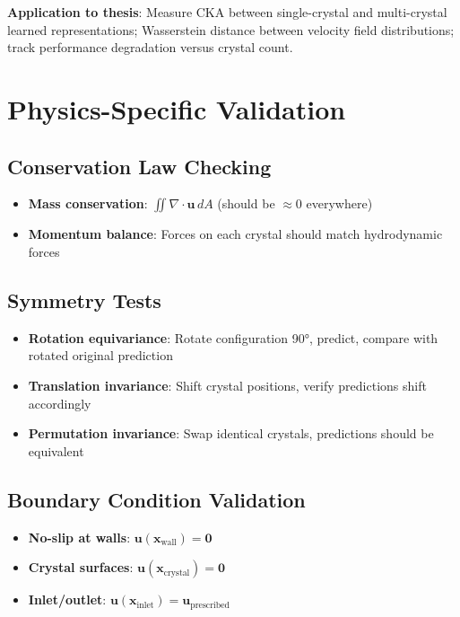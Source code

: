 \textbf{Application to thesis}: Measure CKA between single-crystal and multi-crystal learned representations; Wasserstein distance between velocity field distributions; track performance degradation versus crystal count.

\section{Physics-Specific Validation}

\subsection{Conservation Law Checking}
\begin{itemize}
    \item \textbf{Mass conservation}: $\iint \nabla \cdot \mathbf{u} \, dA$ (should be $\approx 0$ everywhere)
    \item \textbf{Momentum balance}: Forces on each crystal should match hydrodynamic forces
\end{itemize}

\subsection{Symmetry Tests}
\begin{itemize}
    \item \textbf{Rotation equivariance}: Rotate configuration 90°, predict, compare with rotated original prediction
    \item \textbf{Translation invariance}: Shift crystal positions, verify predictions shift accordingly
    \item \textbf{Permutation invariance}: Swap identical crystals, predictions should be equivalent
\end{itemize}

\subsection{Boundary Condition Validation}
\begin{itemize}
    \item \textbf{No-slip at walls}: $\mathbf{u}(\mathbf{x}_{\text{wall}}) = \mathbf{0}$
    \item \textbf{Crystal surfaces}: $\mathbf{u}(\mathbf{x}_{\text{crystal}}) = \mathbf{0}$
    \item \textbf{Inlet/outlet}: $\mathbf{u}(\mathbf{x}_{\text{inlet}}) = \mathbf{u}_{\text{prescribed}}$
\end{itemize}

